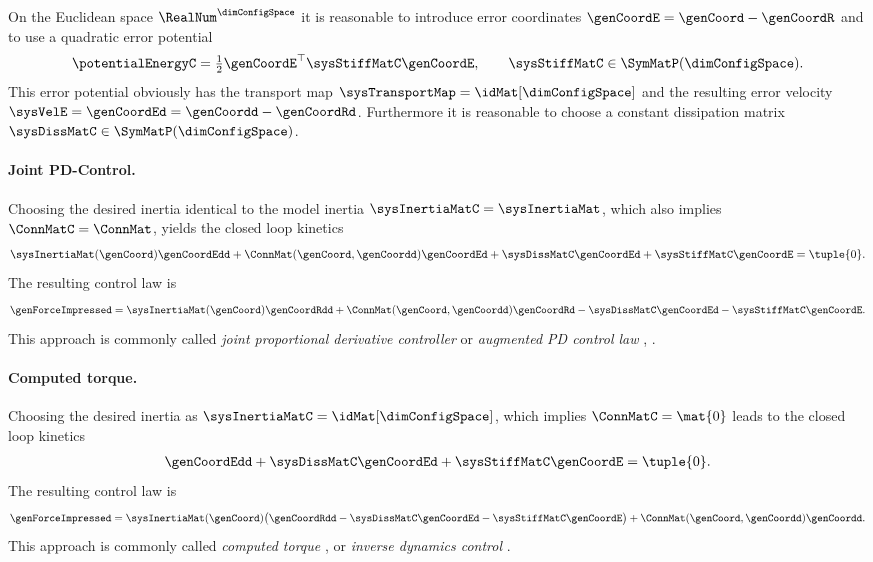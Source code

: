 On the Euclidean space $\RealNum^\dimConfigSpace$ it is reasonable to introduce error coordinates $\genCoordE = \genCoord - \genCoordR$ and to use a quadratic error potential
\begin{align}\label{eq:EuclideanMetricPotential}
 \potentialEnergyC = \tfrac{1}{2} \genCoordE^\top \sysStiffMatC \genCoordE, \qquad \sysStiffMatC \in \SymMatP(\dimConfigSpace).
\end{align}
This error potential obviously has the transport map $\sysTransportMap = \idMat[\dimConfigSpace]$ and the resulting error velocity $\sysVelE = \genCoordEd = \genCoordd - \genCoordRd$.
Furthermore it is reasonable to choose a constant dissipation matrix $\sysDissMatC \in \SymMatP(\dimConfigSpace)$.

\paragraph{Joint PD-Control.}
Choosing the desired inertia identical to the model inertia $\sysInertiaMatC = \sysInertiaMat$, which also implies $\ConnMatC = \ConnMat$, yields the closed loop kinetics
\begin{align}
 \sysInertiaMat(\genCoord) \genCoordEdd + \ConnMat(\genCoord, \genCoordd) \genCoordEd + \sysDissMatC \genCoordEd + \sysStiffMatC \genCoordE = \tuple{0}.
\end{align}
The resulting control law is
\begin{align}
 \genForceImpressed = \sysInertiaMat(\genCoord) \genCoordRdd + \ConnMat(\genCoord, \genCoordd) \genCoordRd - \sysDissMatC \genCoordEd - \sysStiffMatC \genCoordE.
\end{align}
This approach is commonly called \textit{joint proportional derivative controller} \cite[sec.\,9.1.1]{Slotine:AppliedNonlinearControl} or \textit{augmented PD control law} \cite[sec.\,4.5.3]{Murray:Robotic}, \cite[sec.\,8.2]{Spong:RobotModelingAndControl}.

\paragraph{Computed torque.}
Choosing the desired inertia as $\sysInertiaMatC = \idMat[{\dimConfigSpace}]$, which implies $\ConnMatC = \mat{0}$ leads to the closed loop kinetics
\begin{align}
 \genCoordEdd + \sysDissMatC \genCoordEd + \sysStiffMatC \genCoordE = \tuple{0}.
\end{align}
The resulting control law is
\begin{align}
 \genForceImpressed = \sysInertiaMat(\genCoord) \big( \genCoordRdd - \sysDissMatC \genCoordEd - \sysStiffMatC \genCoordE \big) + \ConnMat(\genCoord, \genCoordd) \genCoordd.
\end{align}
This approach is commonly called \textit{computed torque} \cite[sec.\,4.5.2]{Murray:Robotic}, \cite[sec.\,9.1.2]{Slotine:AppliedNonlinearControl} or \textit{inverse dynamics control} \cite[sec.\,8.3]{Spong:RobotModelingAndControl}.

